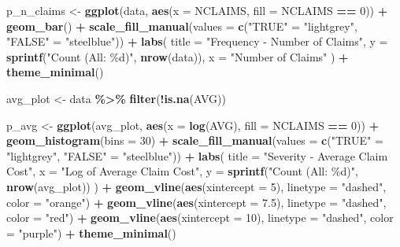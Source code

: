 \documentclass[
  english,
  11pt,
]{article}
\newenvironment{Shaded}{\begin{snugshade}}{\end{snugshade}}
\newcommand{\AttributeTok}[1]{\textcolor[rgb]{0.13,0.29,0.53}{#1}}
\newcommand{\DecValTok}[1]{\textcolor[rgb]{0.00,0.00,0.81}{#1}}
\newcommand{\FloatTok}[1]{\textcolor[rgb]{0.00,0.00,0.81}{#1}}
\newcommand{\FunctionTok}[1]{\textcolor[rgb]{0.13,0.29,0.53}{\textbf{#1}}}
\newcommand{\NormalTok}[1]{#1}
\newcommand{\OtherTok}[1]{\textcolor[rgb]{0.56,0.35,0.01}{#1}}
\newcommand{\SpecialCharTok}[1]{\textcolor[rgb]{0.81,0.36,0.00}{\textbf{#1}}}
\newcommand{\StringTok}[1]{\textcolor[rgb]{0.31,0.60,0.02}{#1}}
\begin{document}
\begin{Shaded}
\begin{Highlighting}[]
\NormalTok{p\_n\_claims }\OtherTok{\textless{}{-}} \FunctionTok{ggplot}\NormalTok{(data, }\FunctionTok{aes}\NormalTok{(}\AttributeTok{x =}\NormalTok{ NCLAIMS, }\AttributeTok{fill =}\NormalTok{ NCLAIMS }\SpecialCharTok{==} \DecValTok{0}\NormalTok{)) }\SpecialCharTok{+}
    \FunctionTok{geom\_bar}\NormalTok{() }\SpecialCharTok{+}
    \FunctionTok{scale\_fill\_manual}\NormalTok{(}\AttributeTok{values =} \FunctionTok{c}\NormalTok{(}\StringTok{"TRUE"} \OtherTok{=} \StringTok{"lightgrey"}\NormalTok{, }\StringTok{"FALSE"} \OtherTok{=} \StringTok{"steelblue"}\NormalTok{)) }\SpecialCharTok{+}
    \FunctionTok{labs}\NormalTok{(}
        \AttributeTok{title =} \StringTok{"Frequency {-} Number of Claims"}\NormalTok{,}
        \AttributeTok{y =} \FunctionTok{sprintf}\NormalTok{(}\StringTok{"Count (All: \%d)"}\NormalTok{, }\FunctionTok{nrow}\NormalTok{(data)),}
        \AttributeTok{x =} \StringTok{"Number of Claims"}
\NormalTok{    ) }\SpecialCharTok{+}
    \FunctionTok{theme\_minimal}\NormalTok{()}

\NormalTok{avg\_plot }\OtherTok{\textless{}{-}}\NormalTok{ data }\SpecialCharTok{\%\textgreater{}\%} \FunctionTok{filter}\NormalTok{(}\SpecialCharTok{!}\FunctionTok{is.na}\NormalTok{(AVG))}

\NormalTok{p\_avg }\OtherTok{\textless{}{-}} \FunctionTok{ggplot}\NormalTok{(avg\_plot, }\FunctionTok{aes}\NormalTok{(}\AttributeTok{x =} \FunctionTok{log}\NormalTok{(AVG), }\AttributeTok{fill =}\NormalTok{ NCLAIMS }\SpecialCharTok{==} \DecValTok{0}\NormalTok{)) }\SpecialCharTok{+}
    \FunctionTok{geom\_histogram}\NormalTok{(}\AttributeTok{bins =} \DecValTok{30}\NormalTok{) }\SpecialCharTok{+}
    \FunctionTok{scale\_fill\_manual}\NormalTok{(}\AttributeTok{values =} \FunctionTok{c}\NormalTok{(}\StringTok{"TRUE"} \OtherTok{=} \StringTok{"lightgrey"}\NormalTok{, }\StringTok{"FALSE"} \OtherTok{=} \StringTok{"steelblue"}\NormalTok{)) }\SpecialCharTok{+}
    \FunctionTok{labs}\NormalTok{(}
        \AttributeTok{title =} \StringTok{"Severity {-} Average Claim Cost"}\NormalTok{,}
        \AttributeTok{x =} \StringTok{"Log of Average Claim Cost"}\NormalTok{,}
        \AttributeTok{y =} \FunctionTok{sprintf}\NormalTok{(}\StringTok{"Count (All: \%d)"}\NormalTok{, }\FunctionTok{nrow}\NormalTok{(avg\_plot))}
\NormalTok{    ) }\SpecialCharTok{+}
    \FunctionTok{geom\_vline}\NormalTok{(}\FunctionTok{aes}\NormalTok{(}\AttributeTok{xintercept =} \DecValTok{5}\NormalTok{), }\AttributeTok{linetype =} \StringTok{"dashed"}\NormalTok{, }\AttributeTok{color =} \StringTok{"orange"}\NormalTok{) }\SpecialCharTok{+}
    \FunctionTok{geom\_vline}\NormalTok{(}\FunctionTok{aes}\NormalTok{(}\AttributeTok{xintercept =} \FloatTok{7.5}\NormalTok{), }\AttributeTok{linetype =} \StringTok{"dashed"}\NormalTok{, }\AttributeTok{color =} \StringTok{"red"}\NormalTok{) }\SpecialCharTok{+}
    \FunctionTok{geom\_vline}\NormalTok{(}\FunctionTok{aes}\NormalTok{(}\AttributeTok{xintercept =} \DecValTok{10}\NormalTok{), }\AttributeTok{linetype =} \StringTok{"dashed"}\NormalTok{, }\AttributeTok{color =} \StringTok{"purple"}\NormalTok{) }\SpecialCharTok{+}
    \FunctionTok{theme\_minimal}\NormalTok{()}


\end{Highlighting}
\end{Shaded}
\end{document}
